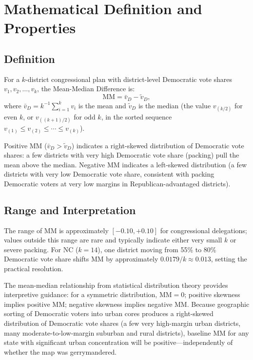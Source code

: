 \section{Mathematical Definition and Properties}
\label{sec:definition}

\subsection{Definition}

For a $k$-district congressional plan with district-level Democratic vote shares
$v_1, v_2, \ldots, v_k$, the Mean-Median Difference is:
\[
\text{MM} = \bar{v}_D - \tilde{v}_D,
\]
where $\bar{v}_D = k^{-1}\sum_{i=1}^k v_i$ is the mean and $\tilde{v}_D$ is
the median (the value $v_{(k/2)}$ for even $k$, or $v_{((k+1)/2)}$ for odd $k$,
in the sorted sequence $v_{(1)} \leq v_{(2)} \leq \cdots \leq v_{(k)}$).

Positive MM ($\bar{v}_D > \tilde{v}_D$) indicates a right-skewed distribution
of Democratic vote shares: a few districts with very high Democratic vote share
(packing) pull the mean above the median. Negative MM indicates a left-skewed
distribution (a few districts with very low Democratic vote share, consistent
with packing Democratic voters at very low margins in Republican-advantaged districts).

\subsection{Range and Interpretation}

The range of MM is approximately $[-0.10, +0.10]$ for congressional delegations;
values outside this range are rare and typically indicate either very small $k$
or severe packing. For NC ($k=14$), one district moving from 55\% to 80\%
Democratic vote share shifts MM by approximately $0.0179 / k \approx 0.013$,
setting the practical resolution.

The mean-median relationship from statistical distribution theory provides
interpretive guidance: for a symmetric distribution, $\text{MM} = 0$; positive
skewness implies positive MM; negative skewness implies negative MM. Because
geographic sorting of Democratic voters into urban cores produces a right-skewed
distribution of Democratic vote shares (a few very high-margin urban districts,
many moderate-to-low-margin suburban and rural districts), baseline MM for any
state with significant urban concentration will be positive---independently of
whether the map was gerrymandered.

